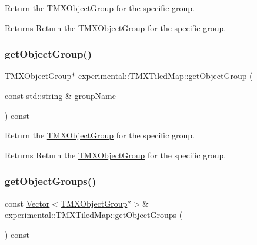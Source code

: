 Return the \hyperlink{classTMXObjectGroup}{T\+M\+X\+Object\+Group} for the specific group.

\begin{DoxyReturn}{Returns}
Return the \hyperlink{classTMXObjectGroup}{T\+M\+X\+Object\+Group} for the specific group. 
\end{DoxyReturn}
\mbox{\label{classexperimental_1_1TMXTiledMap_a228acd16694e514f7bf80fcd66eae937}} 
\subsubsection{\texorpdfstring{get\+Object\+Group()}{getObjectGroup()}\hspace{0.1cm}{\footnotesize\ttfamily [2/2]}}
{\footnotesize\ttfamily \hyperlink{classTMXObjectGroup}{T\+M\+X\+Object\+Group}$\ast$ experimental\+::\+T\+M\+X\+Tiled\+Map\+::get\+Object\+Group (\begin{DoxyParamCaption}\item[{const std\+::string \&}]{group\+Name }\end{DoxyParamCaption}) const}

Return the \hyperlink{classTMXObjectGroup}{T\+M\+X\+Object\+Group} for the specific group.

\begin{DoxyReturn}{Returns}
Return the \hyperlink{classTMXObjectGroup}{T\+M\+X\+Object\+Group} for the specific group. 
\end{DoxyReturn}
\mbox{\label{classexperimental_1_1TMXTiledMap_a365b6b7cec1899006fa7dd22cb1d0914}} 
\subsubsection{\texorpdfstring{get\+Object\+Groups()}{getObjectGroups()}\hspace{0.1cm}{\footnotesize\ttfamily [1/2]}}
{\footnotesize\ttfamily const \hyperlink{classVector}{Vector}$<$\hyperlink{classTMXObjectGroup}{T\+M\+X\+Object\+Group}$\ast$$>$\& experimental\+::\+T\+M\+X\+Tiled\+Map\+::get\+Object\+Groups (\begin{DoxyParamCaption}{ }\end{DoxyParamCaption}) const\hspace{0.3cm}{\ttfamily [inline]}}

